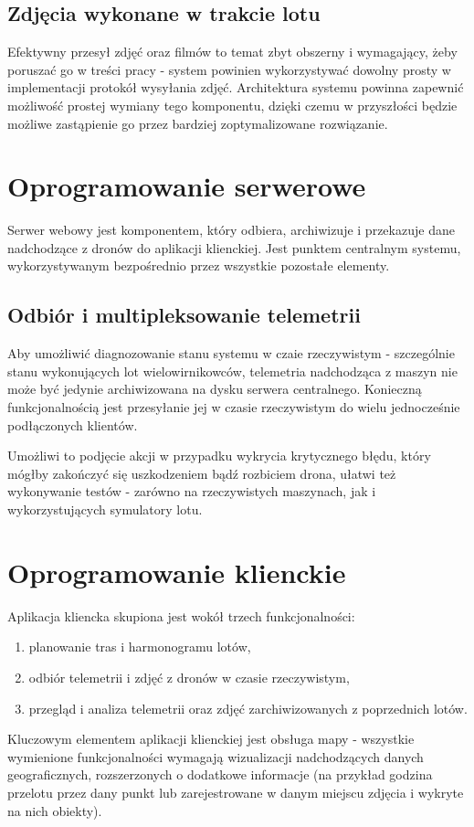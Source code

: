 \subsection{Zdjęcia wykonane w trakcie lotu}
Efektywny przesył zdjęć oraz filmów to temat zbyt obszerny
i wymagający, żeby poruszać go w treści pracy - system
powinien wykorzystywać dowolny prosty w implementacji
protokół wysyłania zdjęć. Architektura systemu powinna
zapewnić możliwość prostej wymiany tego komponentu, dzięki
czemu w przyszłości będzie możliwe zastąpienie go
przez bardziej zoptymalizowane rozwiązanie.

\section{Oprogramowanie serwerowe}

Serwer webowy jest komponentem, który odbiera, archiwizuje i przekazuje
dane nadchodzące z dronów do aplikacji klienckiej. Jest punktem centralnym systemu,
wykorzystywanym bezpośrednio przez wszystkie pozostałe elementy.

\subsection{Odbiór i multipleksowanie telemetrii}

Aby umożliwić diagnozowanie stanu systemu w czaie rzeczywistym - szczególnie
stanu wykonujących lot wielowirnikowców, telemetria nadchodząca z maszyn nie może być
jedynie archiwizowana na dysku serwera centralnego. Konieczną funkcjonalnością jest
przesyłanie jej w czasie rzeczywistym do wielu jednocześnie podłączonych klientów.

Umożliwi to podjęcie akcji w przypadku wykrycia krytycznego błędu, który mógłby
zakończyć się uszkodzeniem bądź rozbiciem drona, ułatwi też wykonywanie testów - zarówno
na rzeczywistych maszynach, jak i wykorzystujących symulatory lotu.

\section{Oprogramowanie klienckie}

Aplikacja kliencka skupiona jest wokół trzech funkcjonalności:

\begin{enumerate}
    \item planowanie tras i harmonogramu lotów,
    \item odbiór telemetrii i zdjęć z dronów w czasie rzeczywistym,
    \item przegląd i analiza telemetrii oraz zdjęć zarchiwizowanych z poprzednich lotów.
\end{enumerate}

Kluczowym elementem aplikacji klienckiej jest obsługa mapy - wszystkie
wymienione funkcjonalności wymagają wizualizacji nadchodzących danych geograficznych,
rozszerzonych o dodatkowe informacje (na przykład godzina przelotu przez dany punkt lub
zarejestrowane w danym miejscu zdjęcia i wykryte na nich obiekty).